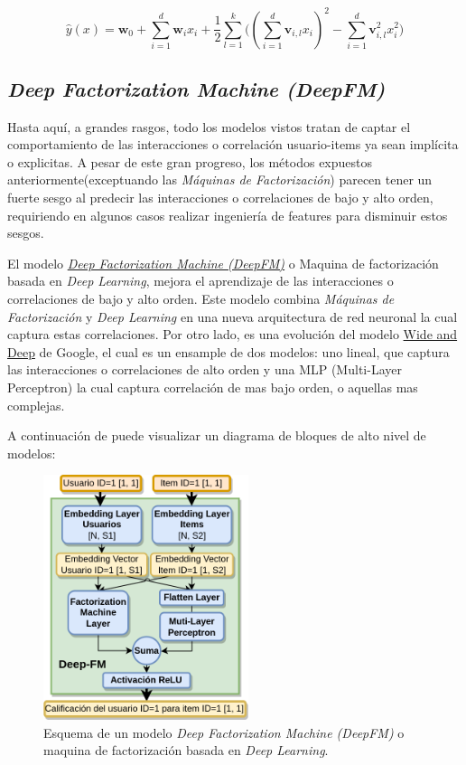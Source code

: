\documentclass[11pt,a4paper,twoside]{thesis}
\begin{document}
\begin{equation}
	\hat{y}(x) = \mathbf{w}_0 + \sum_{i=1}^d \mathbf{w}_i x_i + \frac{1}{2} \sum_{l=1}^k \big ((\sum_{i=1}^d \mathbf{v}_{i, l} x_i)^2 - \sum_{i=1}^d \mathbf{v}_{i, l}^2 x_i^2)
\end{equation}


\clearpage


\subsection{\textit{Deep Factorization Machine (DeepFM)}}

Hasta aquí, a grandes rasgos, todo los modelos vistos tratan de captar el comportamiento de las interacciones o correlación usuario-items ya sean implícita o explicitas. A pesar de este gran progreso, los métodos expuestos anteriormente(exceptuando las \textit{Máquinas de Factorización}) parecen tener un fuerte sesgo al predecir las interacciones o correlaciones de bajo y alto orden, requiriendo en algunos casos realizar ingeniería de features para disminuir estos sesgos. 

El modelo \href{https://arxiv.org/pdf/1703.04247.pdf}{\textit{Deep Factorization Machine (DeepFM)}} o Maquina de factorización basada en \textit{Deep Learning}, mejora el aprendizaje de las interacciones o correlaciones de bajo y alto orden. Este modelo combina \textit{Máquinas de Factorización} y \textit{Deep Learning} en una nueva arquitectura de red neuronal la cual captura estas correlaciones. Por otro lado, es una evolución del modelo \href{https://arxiv.org/pdf/1606.07792.pdf}{Wide and Deep} de Google, el cual es un ensample de dos modelos: uno lineal, que captura las interacciones o correlaciones de alto orden y una MLP (Multi-Layer Perceptron) la cual captura correlación de mas bajo orden, o aquellas mas complejas.

A continuación de puede visualizar un diagrama de bloques de alto nivel de modelos:

\begin{figure}[h!]
	\centering
	\includegraphics[width=6cm]{./images/Deep-MF.png}
	\caption{
		Esquema de un modelo \textit{Deep Factorization Machine (DeepFM)} o maquina de factorización basada en \textit{Deep Learning}.
	}
	\label{fig:DeepMFModel}
\end{figure}
\end{document}

